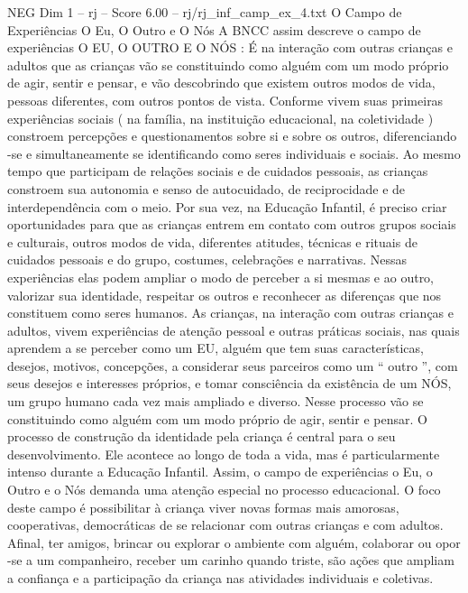 \begin{textsample}{NEG Dim 1 – rj – Score 6.00 – rj/rj\_inf\_camp\_ex\_4.txt}  \label{ex:f1_neg_020}
O Campo de Experiências O Eu, O Outro e O Nós A BNCC assim descreve o campo de experiências O EU, O OUTRO E O NÓS : É na interação com outras crianças e adultos que as crianças vão se constituindo como alguém com um modo próprio de agir, sentir e pensar, e vão descobrindo que existem outros modos de vida, pessoas diferentes, com outros pontos de vista.
Conforme vivem suas primeiras experiências sociais ( na família, na instituição educacional, na coletividade ) constroem percepções e questionamentos sobre si e sobre os outros, diferenciando -se e simultaneamente se identificando como seres individuais e sociais.
Ao mesmo tempo que participam de relações sociais e de cuidados pessoais, as crianças constroem sua autonomia e senso de autocuidado, de reciprocidade e de interdependência com o meio.
Por sua vez, na Educação Infantil, é preciso criar oportunidades para que as crianças entrem em contato com outros grupos sociais e culturais, outros modos de vida, diferentes atitudes, técnicas e rituais de cuidados pessoais e do grupo, costumes, celebrações e narrativas.
Nessas experiências elas podem ampliar o modo de perceber a si mesmas e ao outro, valorizar sua identidade, respeitar os outros e reconhecer as diferenças que nos constituem como seres humanos.
As crianças, na interação com outras crianças e adultos, vivem experiências de atenção pessoal e outras práticas sociais, nas quais aprendem a se perceber como um EU, alguém que tem suas características, desejos, motivos, concepções, a considerar seus parceiros como um “ outro ”, com seus desejos e interesses próprios, e tomar consciência da existência de um NÓS, um grupo humano cada vez mais ampliado e diverso.
Nesse processo vão se constituindo como alguém com um modo próprio de agir, sentir e pensar.
O processo de construção da identidade pela criança é central para o seu desenvolvimento.
Ele acontece ao longo de toda a vida, mas é particularmente intenso durante a Educação Infantil.
Assim, o campo de experiências o Eu, o Outro e o Nós demanda uma atenção especial no processo educacional.
O foco deste campo é possibilitar à criança viver novas formas mais amorosas, cooperativas, democráticas de se relacionar com outras crianças e com adultos.
Afinal, ter amigos, brincar ou explorar o ambiente com alguém, colaborar ou opor -se a um companheiro, receber um carinho quando triste, são ações que ampliam a confiança e a participação da criança nas atividades individuais e coletivas.

\end{textsample}
